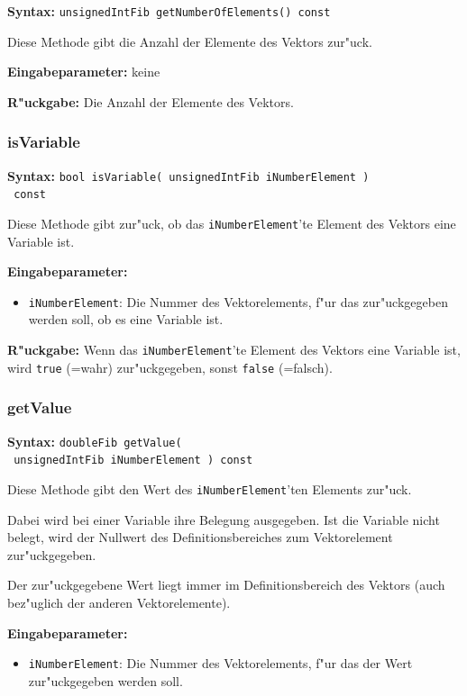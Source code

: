 \textbf{Syntax:} \verb|unsignedIntFib getNumberOfElements() const|

\bigskip\noindent
Diese Methode gibt die Anzahl der Elemente des Vektors zur"uck.

\bigskip\noindent
\textbf{Eingabeparameter:} keine

\bigskip\noindent
\textbf{R"uckgabe:} Die Anzahl der Elemente des Vektors.


\subsubsection{isVariable}

\textbf{Syntax:} \verb|bool isVariable( unsignedIntFib iNumberElement )| \\\verb| const|

\bigskip\noindent
Diese Methode gibt zur"uck, ob das \verb|iNumberElement|'te Element des Vektors eine Variable ist.

\bigskip\noindent
\textbf{Eingabeparameter:}
\begin{itemize}
 \item \verb|iNumberElement|: Die Nummer des Vektorelements, f"ur das zur"uckgegeben werden soll, ob es eine Variable ist.
\end{itemize}

\bigskip\noindent
\textbf{R"uckgabe:} Wenn das \verb|iNumberElement|'te Element des Vektors eine Variable ist, wird \verb|true| (=wahr) zur"uckgegeben, sonst \verb|false| (=falsch).


\subsubsection{getValue}

\textbf{Syntax:} \verb|doubleFib getValue(| \\\verb| unsignedIntFib iNumberElement ) const|

\bigskip\noindent
Diese Methode gibt den Wert des \verb|iNumberElement|'ten Elements zur"uck.

Dabei wird bei einer Variable ihre Belegung ausgegeben. Ist die Variable nicht belegt, wird der Nullwert des Definitionsbereiches zum Vektorelement zur"uckgegeben.

Der zur"uckgegebene Wert liegt immer im Definitionsbereich des Vektors (auch bez"uglich der anderen Vektorelemente).

\bigskip\noindent
\textbf{Eingabeparameter:}
\begin{itemize}
 \item \verb|iNumberElement|: Die Nummer des Vektorelements, f"ur das der Wert zur"uckgegeben werden soll.
\end{itemize}

